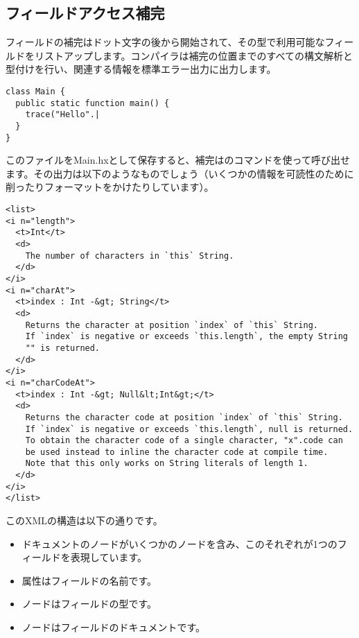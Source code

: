 \subsection{フィールドアクセス補完}
\label{cr-completion-field-access}

フィールドの補完はドット文字の後から開始されて、その型で利用可能なフィールドをリストアップします。コンパイラは補完の位置までのすべての構文解析と型付けを行い、関連する情報を標準エラー出力に出力します。

\begin{lstlisting}
class Main {
  public static function main() {
    trace("Hello".|
  }
}
\end{lstlisting}

このファイルをMain.hxとして保存すると、補完はのコマンドを使って呼び出せます。その出力は以下のようなものでしょう（いくつかの情報を可読性のために削ったりフォーマットをかけたりしています）。

\begin{lstlisting}
<list>
<i n="length">
  <t>Int</t>
  <d>
    The number of characters in `this` String.
  </d>
</i>
<i n="charAt">
  <t>index : Int -&gt; String</t>
  <d>
    Returns the character at position `index` of `this` String.
    If `index` is negative or exceeds `this.length`, the empty String
    "" is returned.
  </d>
</i>
<i n="charCodeAt">
  <t>index : Int -&gt; Null&lt;Int&gt;</t>
  <d>
    Returns the character code at position `index` of `this` String.
    If `index` is negative or exceeds `this.length`, null is returned.
    To obtain the character code of a single character, "x".code can
    be used instead to inline the character code at compile time.
    Note that this only works on String literals of length 1.
  </d>
</i>
</list>
\end{lstlisting}

このXMLの構造は以下の通りです。

\begin{itemize}
	\item ドキュメントのノードがいくつかのノードを含み、このそれぞれが1つのフィールドを表現しています。
	\item {}属性はフィールドの名前です。
	\item {}ノードはフィールドの型です。
	\item {}ノードはフィールドのドキュメントです。
\end{itemize}


